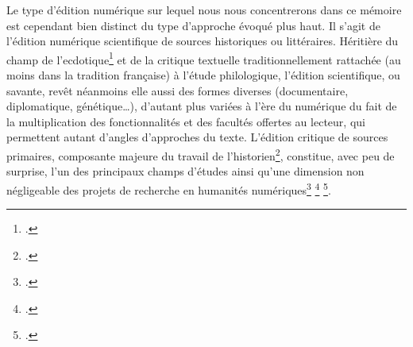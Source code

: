 Le type d’édition numérique sur lequel nous nous concentrerons dans ce mémoire est cependant bien distinct du type d’approche évoqué plus haut. Il s’agit de l’édition numérique scientifique de sources historiques ou littéraires. Héritière du champ de l’ecdotique\footcite{gvelesiani_quest-ce_2017} et de la critique textuelle traditionnellement rattachée (au moins dans la tradition française) à l’étude philologique, l’édition scientifique, ou savante, revêt néanmoins elle aussi des formes diverses (documentaire, diplomatique, génétique…), d’autant plus variées à l’ère du numérique du fait de la multiplication des fonctionnalités et des facultés offertes au lecteur, qui permettent autant d’angles d’approches du texte. L’édition critique de sources primaires, composante majeure du travail de l’historien\footcite{poupeau_ledition_2008}, constitue, avec peu de surprise, l’un des principaux champs d’études ainsi qu’une dimension non négligeable des projets de recherche en humanités numériques\footcite[p.8]{earhart_digital_2012}   \footcite[paragr. 8]{hayles_humanites_2016}   \footcite{anderson_teaching_nodate}.

